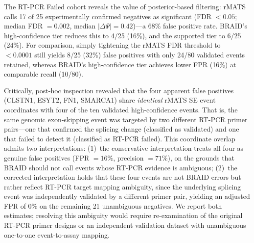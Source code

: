\documentclass[10pt]{article}
\begin{document}
The RT-PCR Failed cohort reveals the value of posterior-based filtering: rMATS calls 17 of 25 experimentally confirmed negatives as significant (FDR $< 0.05$; median FDR $= 0.002$, median $|\Delta\Psi| = 0.42$)---a 68\% false positive rate.
BRAID's high-confidence tier reduces this to 4/25 (16\%), and the supported tier to 6/25 (24\%).
For comparison, simply tightening the rMATS FDR threshold to $< 0.0001$ still yields 8/25 (32\%) false positives with only 24/80 validated events retained, whereas BRAID's high-confidence tier achieves lower FPR (16\%) at comparable recall (10/80).

Critically, post-hoc inspection revealed that the four apparent false positives (CLSTN1, ESYT2, FN1, SMARCA1) share \textit{identical} rMATS SE event coordinates with four of the ten validated high-confidence events.
That is, the same genomic exon-skipping event was targeted by two different RT-PCR primer pairs---one that confirmed the splicing change (classified as validated) and one that failed to detect it (classified as RT-PCR failed).
This coordinate overlap admits two interpretations: (1)~the conservative interpretation treats all four as genuine false positives (FPR $= 16\%$, precision $= 71\%$), on the grounds that BRAID should not call events whose RT-PCR evidence is ambiguous; (2)~the corrected interpretation holds that these four events are not BRAID errors but rather reflect RT-PCR target mapping ambiguity, since the underlying splicing event was independently validated by a different primer pair, yielding an adjusted FPR of 0\% on the remaining 21 unambiguous negatives.
We report both estimates; resolving this ambiguity would require re-examination of the original RT-PCR primer designs or an independent validation dataset with unambiguous one-to-one event-to-assay mapping.
\end{document}

